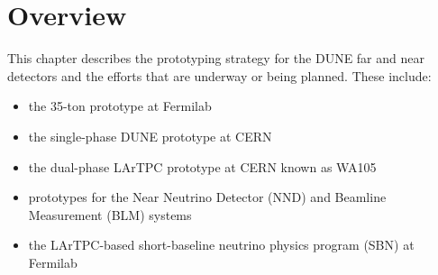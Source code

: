 \section{Overview}
\label{sec:proto-overview}


This chapter describes the prototyping strategy for the DUNE  far and near detectors and the efforts that are underway or being planned.  These include:
\begin{itemize}
\item the 35-ton prototype at Fermilab
\item the single-phase DUNE prototype at CERN
\item the dual-phase LArTPC prototype at CERN known as WA105
\item prototypes for the Near Neutrino Detector (NND) and Beamline Measurement (BLM) systems
\item the LArTPC-based short-baseline neutrino physics program (SBN) at Fermilab
\end{itemize}

